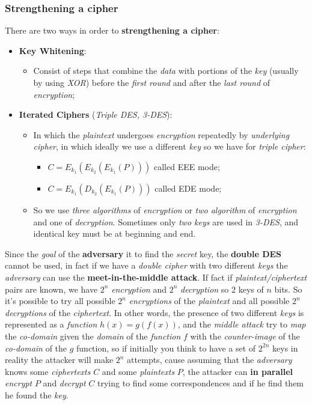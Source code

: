 \documentclass{article}
\begin{document}
\subsubsection{Strengthening a cipher}
There are two ways in order to \textbf{strengthening a cipher}:
\begin{itemize}
\item \textbf{Key Whitening}:
\begin{itemize}
\item Consist of steps that combine the \emph{data} with portions of the \emph{key} (usually by using \emph{XOR}) before the \emph{first round} and after the \emph{last round} of \emph{encryption};
\end{itemize}
\item \textbf{Iterated Ciphers} (\emph{Triple DES, 3-DES}):
\begin{itemize}
\item In which the \emph{plaintext} undergoes \emph{encryption} repeatedly by \emph{underlying cipher}, in which ideally we use a different \emph{key} so we have for \emph{triple cipher}:
\begin{itemize}
\item $C = E_{k_1}(E_{k_2}(E_{k_1}(P)))$ called EEE mode;
\item $C = E_{k_1}(D_{k_2}(E_{k_1}(P)))$ called EDE mode;
\end{itemize}
\item So we use \emph{three algorithms} of \emph{encryption} or \emph{two algorithm} of \emph{encryption} and one of \emph{decryption}. Sometimes only \emph{two keys} are used in \emph{3-DES}, and identical key must be at beginning and end. 
\end{itemize}
\end{itemize}
Since the \emph{goal} of the \textbf{adversary} it to find the \emph{secret }key, the \textbf{double DES} cannot be used, in fact if we have a \emph{double cipher} with two different \emph{keys} the \emph{adversary} can use the \textbf{meet-in-the-middle attack}. If fact if \emph{plaintext/ciphertext} pairs are known, we have $2^n$ \emph{encryption} and $2^n$ \emph{decryption} so $2$ keys of $n$ bits. So it's possible to try all possible $2^n$ \emph{encryptions} of the \emph{plaintext} and all possible $2^n$ \emph{decryptions} of the \emph{ciphertext}. In other words, the presence of two different \emph{keys} is represented as a \emph{function} $h(x) = g(f(x))$, and the \emph{middle attack} try to \emph{map} the \emph{co-domain} given the \emph{domain} of the \emph{function} $f$ with the \emph{counter-image} of the\emph{ co-domain} of the $g$ function, so if initially you think to have a set of $2^{2n}$ keys in reality the attacker will make $2^n$ attempts, cause assuming that the \emph{adversary} knows some \emph{ciphertexts} $C$ and some \emph{plaintexts} $P$, the attacker can \textbf{in parallel} \emph{encrypt} $P$ and \emph{decrypt} $C$ trying to find some correspondences and if he find them he found the \emph{key}.  \\\\
\end{document}
